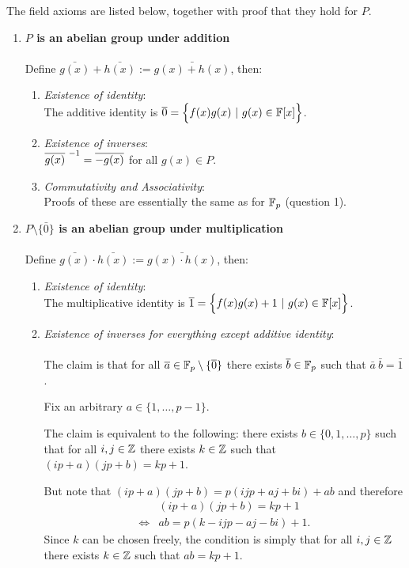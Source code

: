 \documentclass[12pt]{article}
\begin{document}
The field axioms are listed below, together with proof that they hold for $P$.
\begin{enumerate}
\item \textbf{$P$ is an abelian group under addition}\\\\
  Define $\bar{g(x)} + \bar{h(x)} := \bar{g(x) + h(x)}$, then:
  \begin{enumerate}
  \item \textit{Existence of identity}:\\
    The additive identity is $\overline 0 = \Big\{f(x)g(x) ~|~ g(x) \in \mathbb{F}[x]\Big\}$.

  \item \textit{Existence of inverses}:\\
    $\overline{g(x)}^{~{-1}} = \overline{-g(x)}$ for all $g(x) \in P$.
  \item \textit{Commutativity and Associativity}:\\
    Proofs of these are essentially the same as for $\mathbb{F}_p$ (question 1).
  \end{enumerate}
\item \textbf{$P\setminus\{\bar 0\}$ is an abelian group under multiplication}\\\\
  Define $\bar{g(x)} \cdot \bar{h(x)} := \bar{g(x)\cdot h(x)}$, then:
  \begin{enumerate}
  \item \textit{Existence of identity}:\\
    The multiplicative identity is $\overline 1 = \Big\{f(x)g(x) + 1~|~ g(x) \in \mathbb{F}[x]\Big\}$.

  \item \textit{Existence of inverses for everything except additive identity}:\\\\
    The claim is that for all $\overline a \in \mathbb{F}_p \setminus \{\overline 0\}$ there
    exists $\overline b \in \mathbb{F}_p$ such that $\bar a ~ \bar b = \bar 1$.

    Fix an arbitrary $a \in \{1, \ldots, p-1\}$.

    The claim is equivalent to the following: there exists
    $b \in \{0, 1, \ldots, p\}$ such that for all $i, j \in \mathbb{Z}$ there exists
    $k \in \mathbb{Z}$ such that $(ip + a)(jp + b) = kp + 1$.

    But note that $(ip + a)(jp + b) = p(ijp + aj + bi) + ab$ and therefore
    \begin{align*}
      &(ip + a)(jp + b) = kp + 1\\
      \iff &ab = p(k - ijp - aj - bi) + 1.
    \end{align*}
    Since $k$ can be chosen freely, the condition is simply that for all
    $i, j \in \mathbb{Z}$ there exists $k \in \mathbb{Z}$ such that $ab = kp + 1$.


\end{enumerate}
\end{enumerate}
\end{document}
